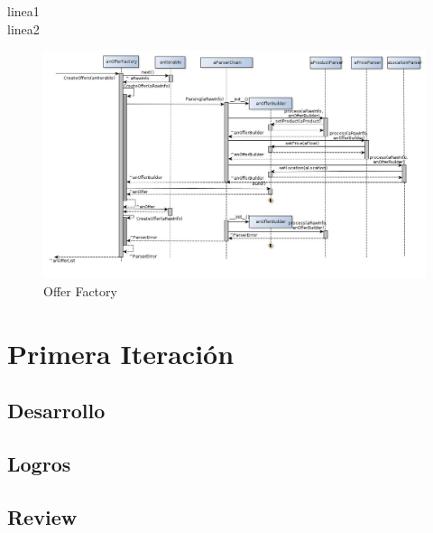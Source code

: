 \documentclass[10pt, a4paper]{article}
\begin{document}
\begin{landscape}
\newpage
linea1\\
linea2\\
\begin{figure}[H]
\centering
\includegraphics[scale=0.60]{graphics/OfferFactory_sequence.jpg}
\caption{Offer Factory}
\end{figure}

\end{landscape}

\section{Primera Iteración}

\subsection{Desarrollo}

\subsection{Logros}

\subsection{Review}
\end{document}
